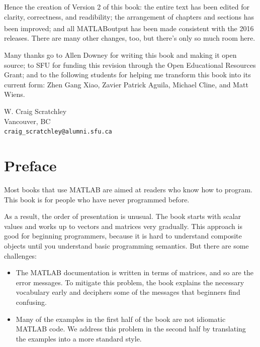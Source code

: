 \documentclass[
]{book}
\numberwithin{Answer}{chapter}
\numberwithin{Exercise}{chapter}
\newcommand{\myreg}{\textsuperscript{{\tiny \textregistered}}}
\begin{document}
Hence the creation of Version 2 of this book: the entire text
has been edited for clarity, correctness, and readibility; the
arrangement of chapters and sections has been improved;
and all MATLAB\myreg output has been made consistent
with the 2016 releases. There are many other
changes, too, but there's only so much room here.

Many thanks go to Allen Downey for writing this book and making it open
source; to SFU for funding this revision through the Open Educational
Resources Grant; and to the following students for helping me transform
this book into its current form: Zhen Gang Xiao, Zavier Patrick Aguila,
Michael Cline, and Matt Wiens.

\noindent W. Craig Scratchley
\\
\noindent Vancouver, BC
\\
{\tt craig\_scratchley@alumni.sfu.ca}

\newpage

\chapter{Preface}


Most books that use MATLAB are aimed at readers who know how
to program.  This book is for people who have never programmed
before.

As a result, the order of presentation is unusual.  The book starts
with scalar values and works up to vectors and matrices very
gradually.  This approach is good for beginning programmers, because
it is hard to understand composite objects until you understand basic
programming semantics.  But there are some challenges:

\begin{itemize}

\item The MATLAB documentation is written in terms of matrices,
and so are the error messages.
To mitigate this problem, the book explains the necessary
vocabulary early and deciphers some of the messages that
beginners find confusing.

\item Many of the examples in the first half of the book are
not idiomatic MATLAB code.  We address this problem in the second
half by translating the examples into a more standard style.

\end{itemize}
\end{document}
